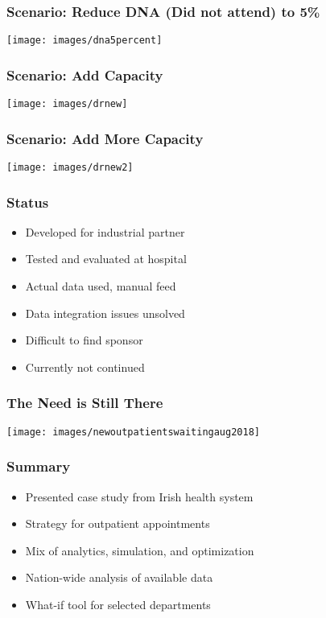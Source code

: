 \documentclass[dvipsnames]{beamer}
\begin{document}
\begin{frame}
\frametitle{Scenario: Reduce DNA (Did not attend) to 5\%}
\texttt{[image: images/dna5percent]}
\end{frame}

\begin{frame}
\frametitle{Scenario: Add Capacity}
\texttt{[image: images/drnew]}
\end{frame}

\begin{frame}
\frametitle{Scenario: Add More Capacity}
\texttt{[image: images/drnew2]}
\end{frame}

\begin{frame}
\frametitle{Status}
\begin{itemize}
\item Developed for industrial partner
\item Tested and evaluated at hospital
\item Actual data used, manual feed
\item Data integration issues unsolved
\item Difficult to find sponsor
\item Currently not continued
\end{itemize}
\end{frame}

\begin{frame}
\frametitle{The Need is Still There}
\texttt{[image: images/newoutpatientswaitingaug2018]}
\end{frame}



\begin{frame}
\frametitle{Summary}
\begin{itemize}
\item Presented case study from Irish health system
\item Strategy for outpatient appointments
\item Mix of analytics, simulation, and optimization
\item Nation-wide analysis of available data
\item What-if tool for selected departments
\end{itemize}
\end{frame}
\end{document}
